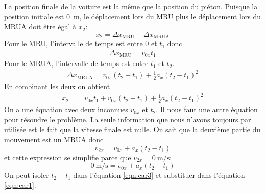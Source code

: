 \begin{enumerate}[a]
    \begin{marginfigure}
    \end{marginfigure}

    La position finale de la voiture est la même que la position du piéton.
    Puisque la position initiale est \SI{0}{\meter}, le déplacement lors du MRU
    plus le déplacement lors du MRUA doit être égal à $x_2$:
    \[
      x_2 = \Delta x_\mathrm{MRU} + \Delta x_\mathrm{MRUA}
    \]
    Pour le MRU, l'intervalle de temps est entre $0$ et $t_1$ donc
    \begin{align*}
      \Delta x_\mathrm{MRU} = v_{0x} t_1
    \end{align*}
    Pour le MRUA, l'intervalle de temps est entre $t_1$ et $t_2$.
    \begin{align*}
      \Delta x_\mathrm{MRUA} = v_{0x} (t_2 - t_1) + \frac{1}{2} a_x (t_2 -
                               t_1)^2
    \end{align*}
    En combinant les deux on obtient
    \begin{align}
      x_2 &= v_{0x} t_1 + v_{0x} (t_2 - t_1) + \frac{1}{2} a_x (t_2 -
                               t_1)^2 \label{eqn:car1}
    \end{align}
    On a une équation avec deux inconnues $v_{0x}$ et $t_2$.  Il nous faut une
    autre équation pour résoudre le problème.  La seule information que nous
    n'avons toujours par utilisée est le fait que la vitesse finale est nulle.
    On sait que la deuxième partie du mouvement est un MRUA donc
    \begin{equation}
      v_{2x} = v_{0x} + a_x (t_2 - t_1)
      \label{eqn:car2}
    \end{equation}
    et cette expression se simplifie parce que $v_{2x} =
    \SI{0}{\meter\per\second}$:
    \begin{equation}
      \SI{0}{\meter\per\second} = v_{0x} + a_x (t_2 - t_1)
      \label{eqn:car3}
    \end{equation}
    On peut isoler $t_2 - t_1$ dans l'équation \ref{eqn:car3} et substituer dans
    l'équation \ref{eqn:car1}.
    \begin{align*}

\end{align*}
\end{enumerate}
